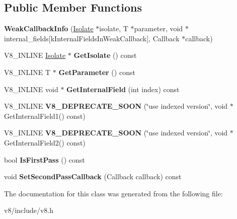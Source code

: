 \subsection*{Public Member Functions}
\begin{DoxyCompactItemize}
\item 
\hypertarget{classv8_1_1WeakCallbackInfo_a0863d1a5dba908ef4ac42298be4ee402}{}{\bfseries Weak\+Callback\+Info} (\hyperlink{classv8_1_1Isolate}{Isolate} $\ast$isolate, T $\ast$parameter, void $\ast$internal\+\_\+fields\mbox{[}k\+Internal\+Fields\+In\+Weak\+Callback\mbox{]}, Callback $\ast$callback)\label{classv8_1_1WeakCallbackInfo_a0863d1a5dba908ef4ac42298be4ee402}

\item 
\hypertarget{classv8_1_1WeakCallbackInfo_a5f0fe68cc18853467d3713b1ec48da9a}{}V8\+\_\+\+I\+N\+L\+I\+N\+E \hyperlink{classv8_1_1Isolate}{Isolate} $\ast$ {\bfseries Get\+Isolate} () const \label{classv8_1_1WeakCallbackInfo_a5f0fe68cc18853467d3713b1ec48da9a}

\item 
\hypertarget{classv8_1_1WeakCallbackInfo_a515eb1547d96a9813e447e8acfb46a1a}{}V8\+\_\+\+I\+N\+L\+I\+N\+E T $\ast$ {\bfseries Get\+Parameter} () const \label{classv8_1_1WeakCallbackInfo_a515eb1547d96a9813e447e8acfb46a1a}

\item 
\hypertarget{classv8_1_1WeakCallbackInfo_ac14e2ded95ad11763a5fdf601e69e004}{}V8\+\_\+\+I\+N\+L\+I\+N\+E void $\ast$ {\bfseries Get\+Internal\+Field} (int index) const \label{classv8_1_1WeakCallbackInfo_ac14e2ded95ad11763a5fdf601e69e004}

\item 
\hypertarget{classv8_1_1WeakCallbackInfo_a20d79e6e6726bfcc76defe69cc0c0a18}{}V8\+\_\+\+I\+N\+L\+I\+N\+E {\bfseries V8\+\_\+\+D\+E\+P\+R\+E\+C\+A\+T\+E\+\_\+\+S\+O\+O\+N} (\char`\"{}use indexed version\char`\"{}, void $\ast$Get\+Internal\+Field1() const)\label{classv8_1_1WeakCallbackInfo_a20d79e6e6726bfcc76defe69cc0c0a18}

\item 
\hypertarget{classv8_1_1WeakCallbackInfo_a81cd4c15b630ff64f42168f1cdb3bf4e}{}V8\+\_\+\+I\+N\+L\+I\+N\+E {\bfseries V8\+\_\+\+D\+E\+P\+R\+E\+C\+A\+T\+E\+\_\+\+S\+O\+O\+N} (\char`\"{}use indexed version\char`\"{}, void $\ast$Get\+Internal\+Field2() const)\label{classv8_1_1WeakCallbackInfo_a81cd4c15b630ff64f42168f1cdb3bf4e}

\item 
\hypertarget{classv8_1_1WeakCallbackInfo_a679a5a0beedac33631e732b77fa6f9d7}{}bool {\bfseries Is\+First\+Pass} () const \label{classv8_1_1WeakCallbackInfo_a679a5a0beedac33631e732b77fa6f9d7}

\item 
\hypertarget{classv8_1_1WeakCallbackInfo_a17590c561d242f1250b4cd4020eb8cd7}{}void {\bfseries Set\+Second\+Pass\+Callback} (Callback callback) const \label{classv8_1_1WeakCallbackInfo_a17590c561d242f1250b4cd4020eb8cd7}

\end{DoxyCompactItemize}


The documentation for this class was generated from the following file\+:\begin{DoxyCompactItemize}
\item 
v8/include/v8.\+h\end{DoxyCompactItemize}
